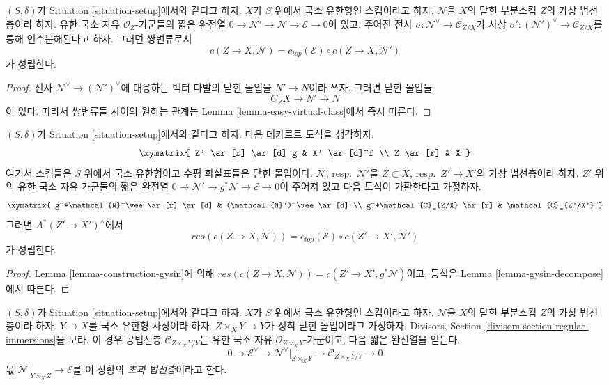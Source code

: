 \begin{lemma}
\label{lemma-gysin-decompose}
$(S, \delta)$가 Situation \ref{situation-setup}에서와 같다고 하자.
$X$가 $S$ 위에서 국소 유한형인 스킴이라고 하자. $\mathcal{N}$을
$X$의 닫힌 부분스킴 $Z$의 가상 법선층이라 하자. 유한 국소 자유
$\mathcal{O}_Z$-가군들의 짧은 완전열
$0 \to \mathcal{N}' \to \mathcal{N} \to \mathcal{E} \to 0$이 있고,
주어진 전사 $\sigma : \mathcal{N}^\vee \to \mathcal{C}_{Z/X}$가 사상
$\sigma' : (\mathcal{N}')^\vee \to \mathcal{C}_{Z/X}$를 통해
인수분해된다고 하자. 그러면 쌍변류로서
$$
c(Z \to X, \mathcal{N}) = c_{top}(\mathcal{E}) \circ c(Z \to X, \mathcal{N}')
$$
가 성립한다.
\end{lemma}

\begin{proof}
전사 $\mathcal{N}^\vee \to (\mathcal{N}')^\vee$에 대응하는 벡터 다발의
닫힌 몰입을 $N' \to N$이라 쓰자. 그러면 닫힌 몰입들
$$
C_ZX \to N' \to N
$$
이 있다. 따라서 쌍변류들 사이의 원하는 관계는 Lemma
\ref{lemma-easy-virtual-class}에서 즉시 따른다.
\end{proof}

\begin{lemma}
\label{lemma-gysin-excess}
$(S, \delta)$가 Situation \ref{situation-setup}에서와 같다고 하자.
다음 데카르트 도식을 생각하자.
$$
\xymatrix{
Z' \ar[r] \ar[d]_g & X' \ar[d]^f \\
Z \ar[r] & X
}
$$
여기서 스킴들은 $S$ 위에서 국소 유한형이고 수평 화살표들은 닫힌
몰입이다. $\mathcal{N}$, resp.\ $\mathcal{N}'$을
$Z \subset X$, resp.\ $Z' \to X'$의 가상 법선층이라 하자.
$Z'$ 위의 유한 국소 자유 가군들의 짧은 완전열
$0 \to \mathcal{N}' \to g^*\mathcal{N} \to \mathcal{E} \to 0$이
주어져 있고 다음 도식이 가환한다고 가정하자.
$$
\xymatrix{
g^*\mathcal{N}^\vee \ar[r] \ar[d] &
(\mathcal{N}')^\vee \ar[d] \\
g^*\mathcal{C}_{Z/X} \ar[r] &
\mathcal{C}_{Z'/X'}
}
$$
그러면 $A^*(Z' \to X')^\wedge$에서
$$
res(c(Z \to X, \mathcal{N})) =
c_{top}(\mathcal{E}) \circ c(Z' \to X', \mathcal{N}')
$$
가 성립한다.
\end{lemma}

\begin{proof}
Lemma \ref{lemma-construction-gysin}에 의해
$res(c(Z \to X, \mathcal{N})) = c(Z' \to X', g^*\mathcal{N})$이고,
등식은 Lemma \ref{lemma-gysin-decompose}에서 따른다.
\end{proof}

\noindent
$(S, \delta)$가 Situation \ref{situation-setup}에서와 같다고 하자.
$X$가 $S$ 위에서 국소 유한형인 스킴이라고 하자. $\mathcal{N}$을
$X$의 닫힌 부분스킴 $Z$의 가상 법선층이라 하자. $Y \to X$를 국소
유한형 사상이라 하자. $Z \times_X Y \to Y$가 정칙 닫힌 몰입이라고
가정하자. Divisors, Section
\ref{divisors-section-regular-immersions}을 보라. 이 경우 공법선층
$\mathcal{C}_{Z \times_X Y/Y}$는 유한 국소 자유
$\mathcal{O}_{Z \times_X Y}$-가군이고, 다음 짧은 완전열을 얻는다.
$$
0 \to \mathcal{E}^\vee \to
\mathcal{N}^\vee|_{Z \times_X Y} \to \mathcal{C}_{Z \times_X Y/Y} \to 0
$$
몫 $\mathcal{N}|_{Y \times_X Z} \to \mathcal{E}$를 이 상황의
{\it 초과 법선층}이라고 한다.

